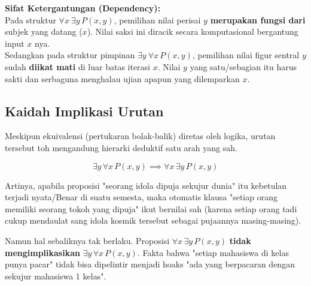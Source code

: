 \begin{konsep}
\textbf{Sifat Ketergantungan (Dependency):} \\
Pada struktur $\forall x \ \exists y \, P(x, y)$, pemilihan nilai perisai $y$ \textbf{merupakan fungsi dari} subjek yang datang ($x$). Nilai saksi ini diracik secara komputasional bergantung input $x$ nya.\\
Sedangkan pada struktur pimpinan $\exists y \ \forall x \, P(x, y)$, pemilihan nilai figur sentral $y$ sudah \textbf{diikat mati} di luar batas iterasi $x$. Nilai $y$ yang satu/sebagian itu harus sakti dan serbaguna menghalau ujian apapun yang dilemparkan $x$.
\end{konsep}

\subsection{Kaidah Implikasi Urutan}

Meskipun ekuivalensi (pertukaran bolak-balik) diretas oleh logika, urutan tersebut toh mengandung hierarki deduktif satu arah yang sah.

\[ \exists y \, \forall x \, P(x,y) \implies \forall x \, \exists y \, P(x,y) \]

Artinya, apabila proposisi "seorang idola dipuja sekujur dunia" itu kebetulan terjadi nyata/Benar di suatu semesta, maka otomatis klausa "setiap orang memiliki seorang tokoh yang dipuja" ikut bernilai sah (karena setiap orang tadi cukup mendaulat sang idola kosmik tersebut sebagai pujaannya masing-masing).

Namun hal sebaliknya tak berlaku. Proposisi $\forall x \, \exists y \, P(x,y)$ \textbf{tidak mengimplikasikan} $\exists y \, \forall x \, P(x,y)$. Fakta bahwa "setiap mahasiswa di kelas punya pacar" tidak bisa dipelintir menjadi hoaks "ada  yang berpacaran dengan sekujur mahasiswa 1 kelas".
